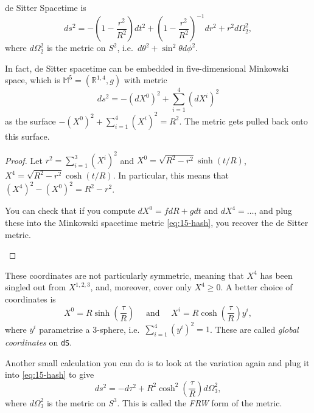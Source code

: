 \begin{definition}[]
  de Sitter Spacetime is
  \begin{equation}
    ds^2 = - \left( 1 - \frac{r^2}{R^2} \right) dt^2 + \left( 1 - \frac{r^2}{R^2} \right)^{-1} dr^2 + r^2 d\Omega^2_2,
  \end{equation}
  where $d\Omega^2_2$ is the metric on $S^2$, i.e.~$d\theta^2 + \sin^2\theta d\phi^2$.
\end{definition}
\begin{claim}
  In fact, de Sitter spacetime can be embedded in five-dimensional Minkowski space, which is $\mathbb{M}^5 = (\mathbb{R}^{1, 4}, g)$ with metric
  \begin{equation}
    \label{eq:15-hash}
    ds^2 = -(dX^0)^2 + \sum_{i=1}^{4} (dX^{i})^2
  \end{equation}
  as the surface $-(X^0)^2 + \sum_{i=1}^{4} (X^{i})^2 = R^2$.
  The metric gets pulled back onto this surface.
\end{claim}
\begin{proof}
  Let $r^2 = \sum_{i=1}^{3} (X^{i})^2$ and $X^0 = \sqrt{R^2 - r^2} \sinh(t/R)$, $X^4 = \sqrt{R^2 - r^2} \cosh(t/R)$. In particular, this means that $(X^4)^2 - (X^0)^2 = R^2 - r^2$.
  \begin{exercise}
    You can check that if you compute $dX^0 = f dR + g dt$ and $dX^4 = \dots$, and plug these into the Minkowski spacetime metric \eqref{eq:15-hash}, you recover the de Sitter metric.
  \end{exercise}
\end{proof}
These coordinates are not particularly symmetric, meaning that $X^4$ has been singled out from $X^{1, 2, 3}$, and, moreover, cover only $X^4 \geq 0$.
A better choice of coordinates is
\begin{equation}
  X^0 = R\sinh( \frac{\tau}{R}) \quad \text{ and } \quad X^{i} = R \cosh( \frac{\tau}{R}) y^{i},
\end{equation}
where $y^{i}$ parametrise a 3-sphere, i.e.~$\sum_{i = 1}^{4} (y^{i})^2 = 1$.
These are called \emph{global coordinates} on \texttt{dS}.
\begin{exercise}
  Another small calculation you can do is to look at the variation again and plug it into \eqref{eq:15-hash} to give
  \begin{equation}
    ds^2 = -d\tau^2 + R^2 \cosh^2\left(\frac{\tau}{R}\right) d\Omega^2_3,
  \end{equation}
  where $d\Omega_3^2$ is the metric on $S^3$.
  This is called the \emph{FRW} form of the metric.
\end{exercise}

